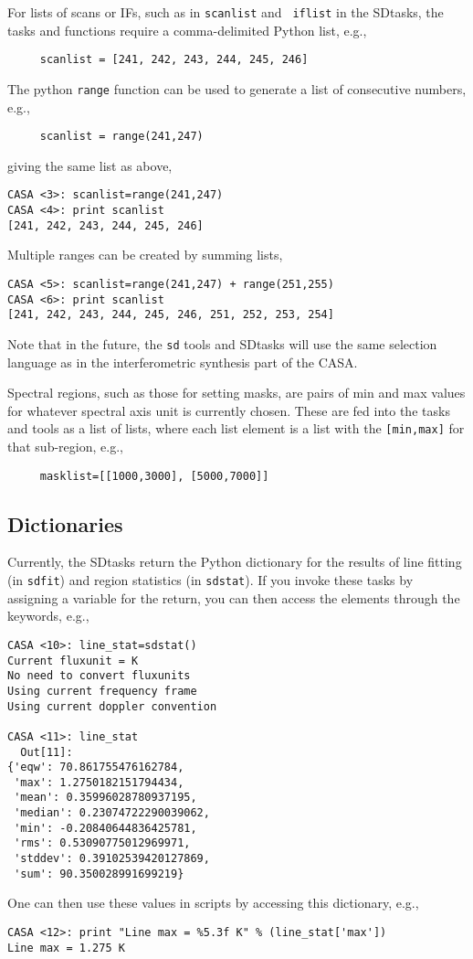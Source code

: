For lists of scans or IFs, such as in {\tt scanlist} and {\tt
iflist} in the SDtasks, the tasks and functions require a comma-delimited 
Python list, e.g.,
\small
\begin{verbatim}
     scanlist = [241, 242, 243, 244, 245, 246] 
\end{verbatim}
\normalsize
The python {\tt range} function can be used to generate a list of
consecutive numbers, e.g.,
\small
\begin{verbatim}
     scanlist = range(241,247) 
\end{verbatim}
\normalsize
giving the same list as above,
\small
\begin{verbatim}
CASA <3>: scanlist=range(241,247)
CASA <4>: print scanlist
[241, 242, 243, 244, 245, 246] 
\end{verbatim}
\normalsize
Multiple ranges can be created by summing lists,
\small
\begin{verbatim}
CASA <5>: scanlist=range(241,247) + range(251,255)
CASA <6>: print scanlist
[241, 242, 243, 244, 245, 246, 251, 252, 253, 254] 
\end{verbatim}
\normalsize
Note that in the future, the {\tt sd} tools and SDtasks will use
the same selection language as in the interferometric synthesis part of the CASA.

Spectral regions, such as those for setting masks, are pairs of
min and max values for whatever spectral axis unit is currently
chosen.  These are fed into the tasks and tools as a list of lists,
where each list element is a list with the {\tt [min,max]} for that
sub-region, e.g.,
\small
\begin{verbatim}
     masklist=[[1000,3000], [5000,7000]] 
\end{verbatim}
\normalsize

\subsection{Dictionaries}
\label{section:sd.intro.dict}

Currently, the SDtasks return the Python dictionary 
for the results of line fitting (in {\tt sdfit})
and region statistics (in {\tt sdstat}).  If you invoke
these tasks by assigning a variable for the return,
you can then access the
elements through the keywords, e.g.,
\small
\begin{verbatim}
CASA <10>: line_stat=sdstat()
Current fluxunit = K
No need to convert fluxunits
Using current frequency frame
Using current doppler convention

CASA <11>: line_stat
  Out[11]: 
{'eqw': 70.861755476162784,
 'max': 1.2750182151794434,
 'mean': 0.35996028780937195,
 'median': 0.23074722290039062,
 'min': -0.20840644836425781,
 'rms': 0.53090775012969971,
 'stddev': 0.39102539420127869,
 'sum': 90.350028991699219}
\end{verbatim}
\normalsize
One can then use these values in scripts by accessing this dictionary,
e.g.,
\small
\begin{verbatim}
CASA <12>: print "Line max = %5.3f K" % (line_stat['max'])
Line max = 1.275 K
\end{verbatim}
\normalsize

